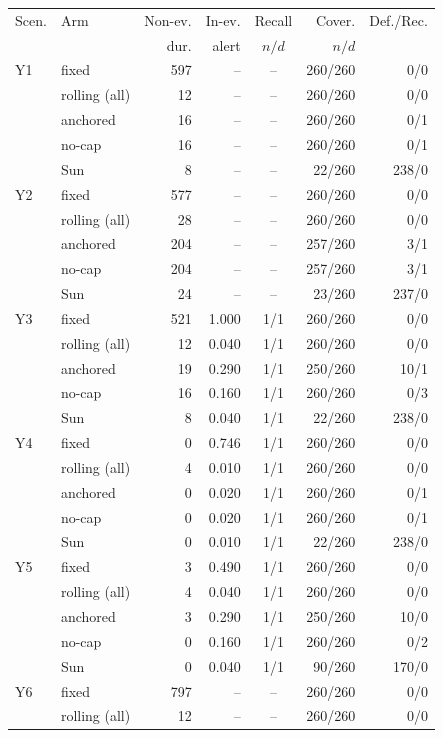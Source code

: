 \begin{tabular}{llrrcrr}
\toprule
Scen. & Arm & Non-ev. & In-ev. & Recall & Cover. & Def./Rec. \\
& & dur. & alert & $n/d$ & $n/d$ & \\
\midrule
Y1 & fixed & 597 & -- & -- & 260/260 & 0/0 \\
 & rolling (all) & 12 & -- & -- & 260/260 & 0/0 \\
 & anchored & 16 & -- & -- & 260/260 & 0/1 \\
 & no-cap & 16 & -- & -- & 260/260 & 0/1 \\
 & Sun & 8 & -- & -- & 22/260 & 238/0 \\
\midrule
Y2 & fixed & 577 & -- & -- & 260/260 & 0/0 \\
 & rolling (all) & 28 & -- & -- & 260/260 & 0/0 \\
 & anchored & 204 & -- & -- & 257/260 & 3/1 \\
 & no-cap & 204 & -- & -- & 257/260 & 3/1 \\
 & Sun & 24 & -- & -- & 23/260 & 237/0 \\
\midrule
Y3 & fixed & 521 & 1.000 & 1/1 & 260/260 & 0/0 \\
 & rolling (all) & 12 & 0.040 & 1/1 & 260/260 & 0/0 \\
 & anchored & 19 & 0.290 & 1/1 & 250/260 & 10/1 \\
 & no-cap & 16 & 0.160 & 1/1 & 260/260 & 0/3 \\
 & Sun & 8 & 0.040 & 1/1 & 22/260 & 238/0 \\
\midrule
Y4 & fixed & 0 & 0.746 & 1/1 & 260/260 & 0/0 \\
 & rolling (all) & 4 & 0.010 & 1/1 & 260/260 & 0/0 \\
 & anchored & 0 & 0.020 & 1/1 & 260/260 & 0/1 \\
 & no-cap & 0 & 0.020 & 1/1 & 260/260 & 0/1 \\
 & Sun & 0 & 0.010 & 1/1 & 22/260 & 238/0 \\
\midrule
Y5 & fixed & 3 & 0.490 & 1/1 & 260/260 & 0/0 \\
 & rolling (all) & 4 & 0.040 & 1/1 & 260/260 & 0/0 \\
 & anchored & 3 & 0.290 & 1/1 & 250/260 & 10/0 \\
 & no-cap & 0 & 0.160 & 1/1 & 260/260 & 0/2 \\
 & Sun & 0 & 0.040 & 1/1 & 90/260 & 170/0 \\
\midrule
Y6 & fixed & 797 & -- & -- & 260/260 & 0/0 \\
 & rolling (all) & 12 & -- & -- & 260/260 & 0/0 \\

\end{tabular}
